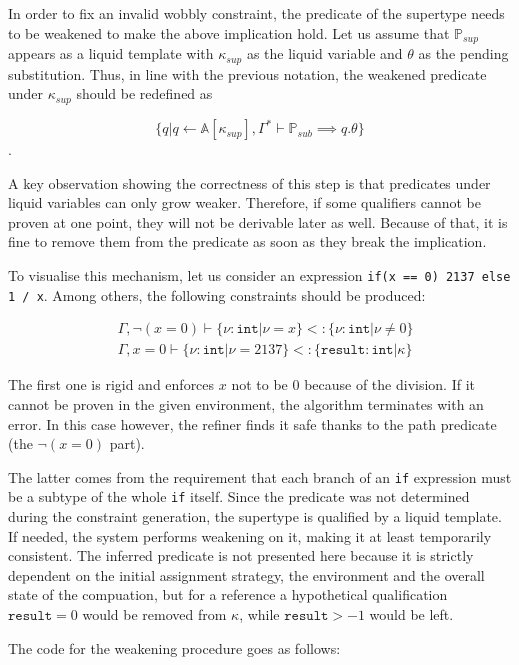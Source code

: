 In order to fix an invalid wobbly constraint, the predicate of the supertype
needs to be weakened to make the above implication hold. Let us assume that
$\mathbb{P}_{sup}$ appears as a liquid template with $\kappa_{sup}$ as the
liquid variable and $\theta$ as the pending substitution. Thus, in line with the
previous notation, the weakened predicate under $\kappa_{sup}$ should be
redefined as

$$\{q | q \leftarrow \mathbb{A}[\kappa_{sup}], \Gamma^* \vdash \mathbb{P}_{sub} \implies q . \theta\}$$.

A key observation showing the correctness of this step is that predicates under
liquid variables can only grow weaker. Therefore, if some qualifiers cannot be
proven at one point, they will not be derivable later as well. Because of that,
it is fine to remove them from the predicate as soon as they break the
implication.

To visualise this mechanism, let us consider an expression \texttt{if(x == 0)
  2137 else 1 / x}. Among others, the following constraints should be
produced:

\begin{align*}
  & \Gamma, \lnot (x = 0) \vdash \{\nu : \texttt{int} | \nu = x\} <: \{\nu : \texttt{int} | \nu \neq  0\}\\
  & \Gamma, x = 0 \vdash \{\nu : \texttt{int} | \nu = 2137\} <: \{\texttt{result} : \texttt{int} |
    \kappa\}
\end{align*}

The first one is rigid and enforces $x$ not to be 0 because of the division. If
it cannot be proven in the given environment, the algorithm terminates with an
error. In this case however, the refiner finds it safe thanks to the path
predicate (the $\lnot (x = 0)$ part).

The latter comes from the requirement that each branch of an \texttt{if}
expression must be a subtype of the whole \texttt{if} itself. Since the
predicate was not determined during the constraint generation, the supertype is
qualified by a liquid template. If needed, the system performs weakening on it,
making it at least temporarily consistent. The inferred predicate is not
presented here because it is strictly dependent on the initial assignment
strategy, the environment and the overall state of the compuation, but for a
reference a hypothetical qualification $\texttt{result} = 0$ would be removed
from $\kappa$, while $\texttt{result} > -1$ would be left.

The code for the weakening procedure goes as follows:

